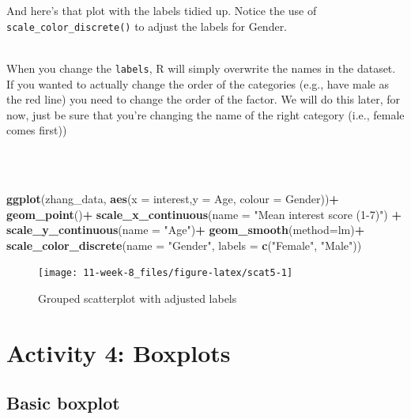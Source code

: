 \documentclass[]{book}
\newenvironment{Shaded}{\begin{snugshade}}{\end{snugshade}}
\newcommand{\DataTypeTok}[1]{\textcolor[rgb]{0.13,0.29,0.53}{#1}}
\newcommand{\KeywordTok}[1]{\textcolor[rgb]{0.13,0.29,0.53}{\textbf{#1}}}
\newcommand{\NormalTok}[1]{#1}
\newcommand{\OperatorTok}[1]{\textcolor[rgb]{0.81,0.36,0.00}{\textbf{#1}}}
\newcommand{\StringTok}[1]{\textcolor[rgb]{0.31,0.60,0.02}{#1}}
\newenvironment{warning}
    {
    \hline\\
    }
    { 
    \\\\\hline
    }
\begin{document}
And here's that plot with the labels tidied up. Notice the use of \texttt{scale\_color\_discrete()} to adjust the labels for Gender.

\begin{warning}
When you change the \texttt{labels}, R will simply overwrite the names
in the dataset. If you wanted to actually change the order of the
categories (e.g., have male as the red line) you need to change the
order of the factor. We will do this later, for now, just be sure that
you're changing the name of the right category (i.e., female comes
first))
\end{warning}

\begin{Shaded}
\begin{Highlighting}[]
\KeywordTok{ggplot}\NormalTok{(zhang_data, }\KeywordTok{aes}\NormalTok{(}\DataTypeTok{x =}\NormalTok{ interest,}\DataTypeTok{y =}\NormalTok{ Age, }\DataTypeTok{colour =}\NormalTok{ Gender))}\OperatorTok{+}
\StringTok{  }\KeywordTok{geom_point}\NormalTok{()}\OperatorTok{+}
\StringTok{  }\KeywordTok{scale_x_continuous}\NormalTok{(}\DataTypeTok{name =} \StringTok{"Mean interest score (1-7)"}\NormalTok{) }\OperatorTok{+}\StringTok{ }
\StringTok{  }\KeywordTok{scale_y_continuous}\NormalTok{(}\DataTypeTok{name =} \StringTok{"Age"}\NormalTok{)}\OperatorTok{+}
\StringTok{  }\KeywordTok{geom_smooth}\NormalTok{(}\DataTypeTok{method=}\NormalTok{lm)}\OperatorTok{+}
\StringTok{  }\KeywordTok{scale_color_discrete}\NormalTok{(}\DataTypeTok{name =} \StringTok{"Gender"}\NormalTok{,}
                       \DataTypeTok{labels =} \KeywordTok{c}\NormalTok{(}\StringTok{"Female"}\NormalTok{, }\StringTok{"Male"}\NormalTok{))}
\end{Highlighting}
\end{Shaded}

\begin{figure}

{\centering \texttt{[image: 11-week-8\_files/figure-latex/scat5-1]} 

}

\caption{Grouped scatterplot with adjusted labels}\label{fig:scat5}
\end{figure}

\hypertarget{activity-4-boxplots}{%
\section{Activity 4: Boxplots}\label{activity-4-boxplots}}

\hypertarget{basic-boxplot}{%
\subsection{Basic boxplot}\label{basic-boxplot}}
\end{document}
